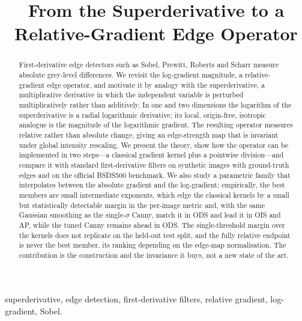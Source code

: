\documentclass[conference]{IEEEtran}
\begin{document}
\title{From the Superderivative to a Relative-Gradient Edge Operator}

\author{
}

\maketitle

\begin{abstract}
First-derivative edge detectors such as Sobel, Prewitt, Roberts and Scharr measure absolute grey-level differences. We revisit the log-gradient magnitude, a relative-gradient edge operator, and motivate it by analogy with the superderivative, a multiplicative derivative in which the independent variable is perturbed multiplicatively rather than additively. In one and two dimensions the logarithm of the superderivative is a radial logarithmic derivative; its local, origin-free, isotropic analogue is the magnitude of the logarithmic gradient. The resulting operator measures relative rather than absolute change, giving an edge-strength map that is invariant under global intensity rescaling. We present the theory, show how the operator can be implemented in two steps---a classical gradient kernel plus a pointwise division---and compare it with standard first-derivative filters on synthetic images with ground-truth edges and on the official BSDS500 benchmark. We also study a parametric family that interpolates between the absolute gradient and the log-gradient; empirically, the best members are small intermediate exponents, which edge the classical kernels by a small but statistically detectable margin in the per-image metric and, with the same Gaussian smoothing as the single-$\sigma$ Canny, match it in ODS and lead it in OIS and AP, while the tuned Canny remains ahead in ODS. The single-threshold margin over the kernels does not replicate on the held-out test split, and the fully relative endpoint is never the best member, its ranking depending on the edge-map normalisation. The contribution is the construction and the invariance it buys, not a new state of the art.
\end{abstract}

\begin{IEEEkeywords}
superderivative, edge detection, first-derivative filters, relative gradient,
log-gradient, Sobel.
\end{IEEEkeywords}
\end{document}
